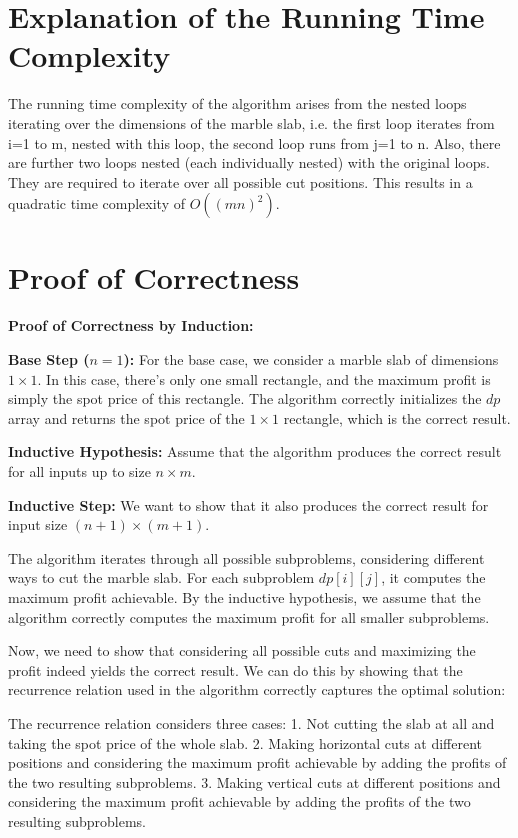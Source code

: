 \documentclass{article}
\begin{document}
\section{Explanation of the Running Time Complexity}
    The running time complexity of the algorithm arises from the nested loops iterating over the dimensions of the marble slab, i.e. the first loop iterates from i=1 to m, nested with this loop, the second loop runs from j=1 to n. Also, there are further two loops nested (each individually nested) with the original loops. They are required to iterate over all possible cut positions. This results in a quadratic time complexity of $O((mn)^2)$.


\section{Proof of Correctness}

    \textbf{Proof of Correctness by Induction:}

    \textbf{Base Step ($n = 1$):}
    For the base case, we consider a marble slab of dimensions $1 \times 1$. In this case, there's only one small rectangle, and the maximum profit is simply the spot price of this rectangle. The algorithm correctly initializes the $dp$ array and returns the spot price of the $1 \times 1$ rectangle, which is the correct result.

    \textbf{Inductive Hypothesis:}
    Assume that the algorithm produces the correct result for all inputs up to size $n \times m$.
    
    \textbf{Inductive Step:}
    We want to show that it also produces the correct result for input size $(n+1) \times (m+1)$.
    
    The algorithm iterates through all possible subproblems, considering different ways to cut the marble slab. For each subproblem $dp[i][j]$, it computes the maximum profit achievable. By the inductive hypothesis, we assume that the algorithm correctly computes the maximum profit for all smaller subproblems.
    
    Now, we need to show that considering all possible cuts and maximizing the profit indeed yields the correct result. We can do this by showing that the recurrence relation used in the algorithm correctly captures the optimal solution:
    
    The recurrence relation considers three cases:
    1. Not cutting the slab at all and taking the spot price of the whole slab.
    2. Making horizontal cuts at different positions and considering the maximum profit achievable by adding the profits of the two resulting subproblems.
    3. Making vertical cuts at different positions and considering the maximum profit achievable by adding the profits of the two resulting subproblems.
\end{document}
